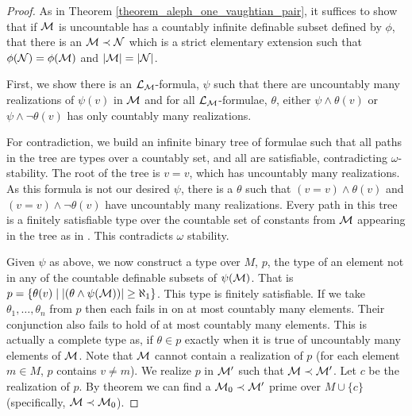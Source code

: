 \begin{proof}
As in Theorem \ref{theorem_aleph_one_vaughtian_pair}, it suffices to show that if \(\mathcal{M}\) is uncountable has a countably infinite definable subset defined by \(\phi\), that there is an \(\mathcal{M} \prec \mathcal{N}\) which is a strict elementary extension such that \(\phi(\mathcal{N}) = \phi(\mathcal{M})\) and \(|\mathcal{M}| = |\mathcal{N}|\).

First, we show there is an \(\mathcal{L}_{\mathcal{M}}\)-formula, \(\psi\) such that there are uncountably many realizations of \(\psi(v)\) in \(\mathcal{M}\) and for all \(\mathcal{L}_{\mathcal{M}}\)-formulae, \(\theta\), either \(\psi \land \theta(v)\) or \(\psi \land \neg\theta(v)\) has only countably many realizations. 

For contradiction, we build an infinite binary tree of formulae such that all paths in the tree are types over a countably set, and all are satisfiable, contradicting \(\omega\)-stability.  
The root of the tree is \(v = v\), which has uncountably many realizations. 
As this formula is not our desired \(\psi\), there is a \(\theta\) such that \((v = v) \land \theta(v)\) and \((v = v) \land \neg \theta(v)\) have uncountably many realizations. 
Every path in this tree is a finitely satisfiable type over the countable set of constants from \(\mathcal{M}\) appearing in the tree as in %
.
This contradicts \(\omega\) stability. 

Given \(\psi\) as above, we now construct a type over \(M\), \(p\), the type of an element not in any of the countable definable subsets of \(\psi(\mathcal{M})\). 
That is \(p = \{\theta(v) \mid |(\theta \land \psi (\mathcal{M}))| \geq \aleph_1\}\).
This type is finitely satisfiable. If we take \(\theta_1, \ldots, \theta_n\) from \(p\) then each fails in on at most countably many elements. 
Their conjunction also fails to hold of at most countably many elements. 
This is actually a complete type as, if \(\theta \in p\) exactly when it is true of uncountably many elements of \(\mathcal{M}\).
Note that \(\mathcal{M}\) cannot contain a realization of \(p\) (for each element \(m \in M\), \(p\) contains \(v \neq m\)). 
We realize \(p\) in \(\mathcal{M}'\) such that \(\mathcal{M} \prec \mathcal{M}'\). 
Let \(c\) be the realization of \(p\). 
By theorem %
we can find a \(\mathcal{M}_0 \prec \mathcal{M}'\) prime over \(M \cup \{c\}\) (specifically, \(\mathcal{M} \prec \mathcal{M}_0\)).


\end{proof}
